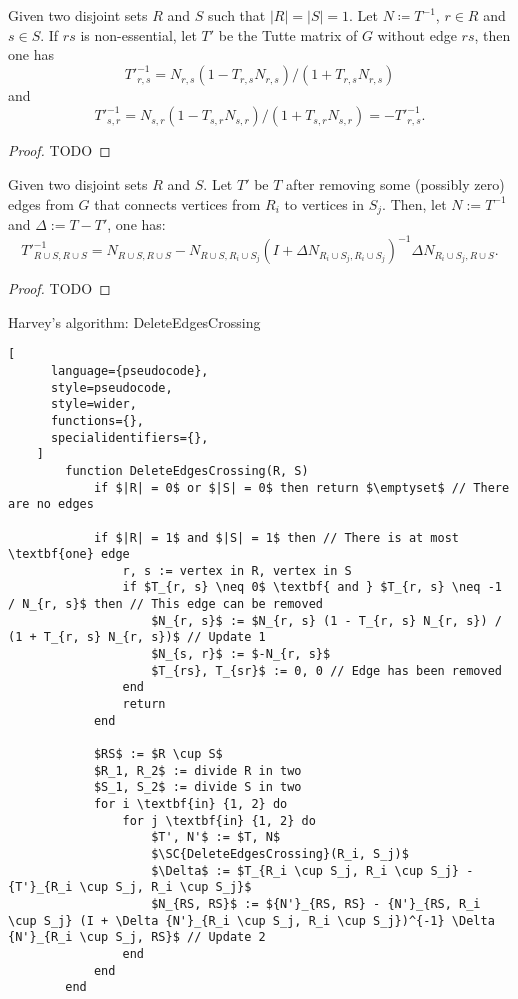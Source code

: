 \begin{theorem}[Update 1]
    Given two disjoint sets \(R\) and \(S\) such that \(|R| = |S| = 1\).
    Let \(N \coloneqq T^{-1}\), \(r \in R\) and \(s \in S\).
    If \(rs\) is non-essential, let \(T'\) be the Tutte matrix of \(G\) without edge \(rs\), then one has
    \[
        T'^{-1}_{r, s} = N_{r, s} (1 - T_{r, s} N_{r, s}) / (1 + T_{r, s} N_{r, s})
    \]
    and
    \[
        T'^{-1}_{s, r} = N_{s, r} (1 - T_{s, r} N_{s, r}) / (1 + T_{s, r} N_{s, r}) = -T'^{-1}_{r, s}.
    \]
\end{theorem}

\begin{proof}
    TODO
\end{proof}

\begin{theorem}[Update 2]
    Given two disjoint sets \(R\) and \(S\). Let \(T'\) be \(T\) after removing some (possibly zero) edges from \(G\) that connects vertices from \(R_i\) to vertices in \(S_j\).
    Then, let \(N := T^{-1}\) and \(\Delta := T - T'\), one has:
    \[
        T'^{-1}_{R \cup S, R \cup S} = N_{R \cup S, R \cup S} - N_{R \cup S, R_i \cup S_j}(I + \Delta N_{R_i \cup S_j, R_i \cup S_j})^{-1} \Delta N_{R_i \cup S_j, R \cup S}.
    \]
\end{theorem}

\begin{proof}
    TODO
\end{proof}

\begin{programruledcaption}{Harvey's algorithm: DeleteEdgesCrossing}
    \begin{lstlisting}[
      language={pseudocode},
      style=pseudocode,
      style=wider,
      functions={},
      specialidentifiers={},
    ]
        function DeleteEdgesCrossing(R, S)
            if $|R| = 0$ or $|S| = 0$ then return $\emptyset$ // There are no edges

            if $|R| = 1$ and $|S| = 1$ then // There is at most \textbf{one} edge
                r, s := vertex in R, vertex in S
                if $T_{r, s} \neq 0$ \textbf{ and } $T_{r, s} \neq -1 / N_{r, s}$ then // This edge can be removed
                    $N_{r, s}$ := $N_{r, s} (1 - T_{r, s} N_{r, s}) / (1 + T_{r, s} N_{r, s})$ // Update 1
                    $N_{s, r}$ := $-N_{r, s}$
                    $T_{rs}, T_{sr}$ := 0, 0 // Edge has been removed
                end
                return
            end

            $RS$ := $R \cup S$
            $R_1, R_2$ := divide R in two 
            $S_1, S_2$ := divide S in two
            for i \textbf{in} {1, 2} do
                for j \textbf{in} {1, 2} do
                    $T', N'$ := $T, N$
                    $\SC{DeleteEdgesCrossing}(R_i, S_j)$
                    $\Delta$ := $T_{R_i \cup S_j, R_i \cup S_j} - {T'}_{R_i \cup S_j, R_i \cup S_j}$
                    $N_{RS, RS}$ := ${N'}_{RS, RS} - {N'}_{RS, R_i \cup S_j} (I + \Delta {N'}_{R_i \cup S_j, R_i \cup S_j})^{-1} \Delta {N'}_{R_i \cup S_j, RS}$ // Update 2
                end
            end
        end
    \end{lstlisting}
\end{programruledcaption}

